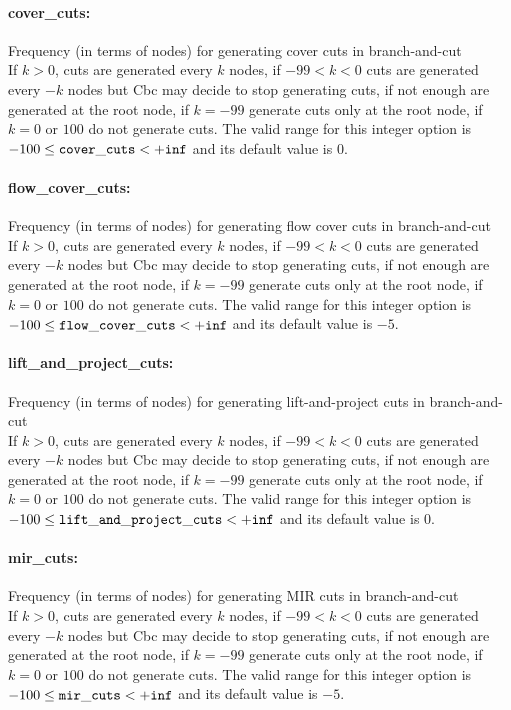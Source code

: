 \paragraph{cover\_cuts:}\label{sec:cover_cuts} Frequency (in terms of nodes) for generating cover cuts in branch-and-cut $\;$ \\
 If $k > 0$, cuts are generated every $k$ nodes,
if $-99 < k < 0$ cuts are generated every $-k$
nodes but Cbc may decide to stop generating cuts,
if not enough are generated at the root node, if
$k=-99$ generate cuts only at the root node, if
$k=0$ or $100$ do not generate cuts. The valid range for this integer option is
$-100 \le {\tt cover\_cuts } <  {\tt +inf}$
and its default value is $0$.


\paragraph{flow\_cover\_cuts:}\label{sec:flow_cover_cuts} Frequency (in terms of nodes) for generating flow cover cuts in branch-and-cut $\;$ \\
 If $k > 0$, cuts are generated every $k$ nodes,
if $-99 < k < 0$ cuts are generated every $-k$
nodes but Cbc may decide to stop generating cuts,
if not enough are generated at the root node, if
$k=-99$ generate cuts only at the root node, if
$k=0$ or $100$ do not generate cuts. The valid range for this integer option is
$-100 \le {\tt flow\_cover\_cuts } <  {\tt +inf}$
and its default value is $-5$.


\paragraph{lift\_and\_project\_cuts:}\label{sec:lift_and_project_cuts} Frequency (in terms of nodes) for generating lift-and-project cuts in branch-and-cut $\;$ \\
 If $k > 0$, cuts are generated every $k$ nodes,
if $-99 < k < 0$ cuts are generated every $-k$
nodes but Cbc may decide to stop generating cuts,
if not enough are generated at the root node, if
$k=-99$ generate cuts only at the root node, if
$k=0$ or $100$ do not generate cuts. The valid range for this integer option is
$-100 \le {\tt lift\_and\_project\_cuts } <  {\tt +inf}$
and its default value is $0$.


\paragraph{mir\_cuts:}\label{sec:mir_cuts} Frequency (in terms of nodes) for generating MIR cuts in branch-and-cut $\;$ \\
 If $k > 0$, cuts are generated every $k$ nodes,
if $-99 < k < 0$ cuts are generated every $-k$
nodes but Cbc may decide to stop generating cuts,
if not enough are generated at the root node, if
$k=-99$ generate cuts only at the root node, if
$k=0$ or $100$ do not generate cuts. The valid range for this integer option is
$-100 \le {\tt mir\_cuts } <  {\tt +inf}$
and its default value is $-5$.


